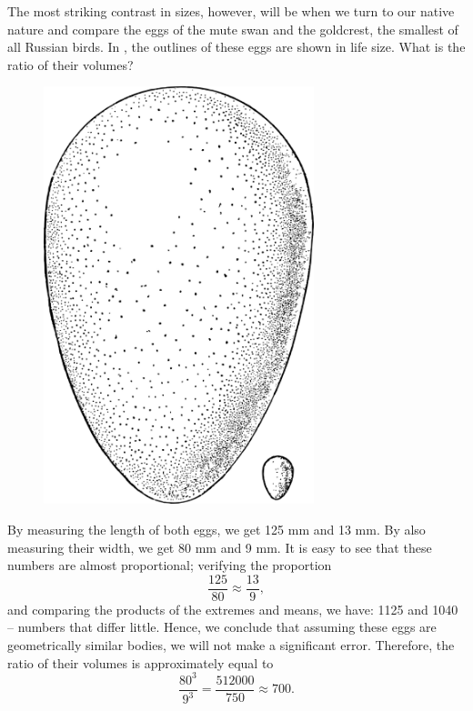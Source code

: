 The most striking contrast in sizes, however, will be when we turn to our native nature and compare the eggs of the mute swan and the goldcrest, the smallest of all Russian birds. In , the outlines of these eggs are shown in life size. What is the ratio of their volumes?

\begin{figure}[h!]
\centering
\includegraphics[width=0.7\textwidth]{figures/ch-11/fig-168.pdf}
\end{figure}

\ans By measuring the length of both eggs, we get 125 mm and 13 mm. By also measuring their width, we get 80 mm and 9 mm. It is easy to see that these numbers are almost proportional; verifying the proportion
\begin{equation*}%
\frac{125}{80} \approx \frac{13}{9},
\end{equation*}
and comparing the products of the extremes and means, we have: 1125 and 1040 -- numbers that differ little. Hence, we conclude that assuming these eggs are geometrically similar bodies, we will not make a significant error. Therefore, the ratio of their volumes is approximately equal to
\begin{equation*}%
\frac{80^3}{9^3} = \frac{512000}{750} \approx 700.
\end{equation*}


